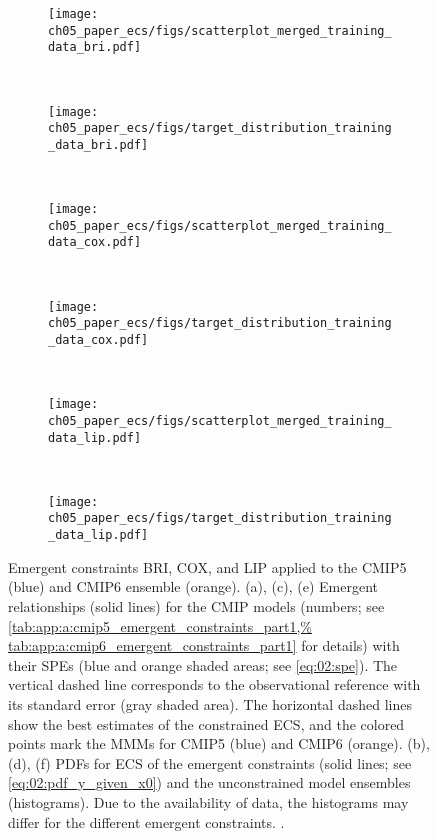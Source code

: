\begin{figure}[p]
  \centering
  \begin{subfigure}[b]{\SmallSubfigureWidth{}}
    \texttt{[image: 
      ch05\_paper\_ecs/figs/scatterplot\_merged\_training\_data\_bri.pdf]}
    \caption{}
    \label{fig:05:bri_cox_lip:a}
  \end{subfigure}
  ~
  \begin{subfigure}[b]{\SmallSubfigureWidth{}}
    \texttt{[image: 
      ch05\_paper\_ecs/figs/target\_distribution\_training\_data\_bri.pdf]}
    \caption{}
    \label{fig:05:bri_cox_lip:b}
  \end{subfigure}
  \\
  \begin{subfigure}[b]{\SmallSubfigureWidth{}}
    \texttt{[image: 
      ch05\_paper\_ecs/figs/scatterplot\_merged\_training\_data\_cox.pdf]}
    \caption{}
    \label{fig:05:bri_cox_lip:c}
  \end{subfigure}
  ~
  \begin{subfigure}[b]{\SmallSubfigureWidth{}}
    \texttt{[image: 
      ch05\_paper\_ecs/figs/target\_distribution\_training\_data\_cox.pdf]}
    \caption{}
    \label{fig:05:bri_cox_lip:d}
  \end{subfigure}
  \\
  \begin{subfigure}[b]{\SmallSubfigureWidth{}}
    \texttt{[image: 
      ch05\_paper\_ecs/figs/scatterplot\_merged\_training\_data\_lip.pdf]}
    \caption{}
    \label{fig:05:bri_cox_lip:e}
  \end{subfigure}
  ~
  \begin{subfigure}[b]{\SmallSubfigureWidth{}}
    \texttt{[image: 
      ch05\_paper\_ecs/figs/target\_distribution\_training\_data\_lip.pdf]}
    \caption{}
    \label{fig:05:bri_cox_lip:f}
  \end{subfigure}
  \caption[
    Emergent constraints BRI, COX, and LIP applied to the \acs{CMIP}5 and
    \acs{CMIP}6 ensemble.
  ]{
    Emergent constraints BRI, COX, and LIP applied to the \acs{CMIP}5 (blue)
    and \acs{CMIP}6 ensemble (orange). (a), (c), (e) Emergent relationships
    (solid lines) for the \acs{CMIP} models (numbers; see
    \cref{tab:app:a:cmip5_emergent_constraints_part1,%
      tab:app:a:cmip6_emergent_constraints_part1} for details) with their
    \aclp{SPE} (blue and orange shaded areas; see \cref{eq:02:spe}). The
    vertical dashed line corresponds to the observational reference with its
    standard error (gray shaded area). The horizontal dashed lines show the
    best estimates of the constrained \acf{ECS}, and the colored points mark
    the \aclp{MMM} for \acs{CMIP}5 (blue) and \acs{CMIP}6 (orange). (b), (d),
    (f) \Aclp{PDF} for \acs{ECS} of the emergent constraints (solid lines;
    see \cref{eq:02:pdf_y_given_x0}) and the unconstrained model ensembles
    (histograms). Due to the availability of data, the histograms may differ
    for the different emergent constraints. .
  }
  \label{fig:05:bri_cox_lip}
\end{figure}


